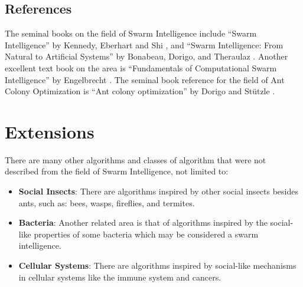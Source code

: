 \begin{bibunit}
\subsection{References}
The seminal books on the field of Swarm Intelligence include ``Swarm Intelligence'' by Kennedy, Eberhart and Shi \cite{Kennedy2001}, and ``Swarm Intelligence: From Natural to Artificial Systems'' by Bonabeau, Dorigo, and Theraulaz \cite{Bonabeau1999}. Another excellent text book on the area is ``Fundamentals of Computational Swarm Intelligence'' by Engelbrecht \cite{Engelbrecht2006}. The seminal book reference for the field of Ant Colony Optimization is ``Ant colony optimization'' by Dorigo and St\"utzle \cite{Dorigo2004}.

% 
% 
\section{Extensions}
There are many other algorithms and classes of algorithm that were not described from the field of Swarm Intelligence, not limited to:

\begin{itemize}
	\item \textbf{Social Insects}: There are algorithms inspired by other social insects besides ants, such as: bees, wasps, fireflies, and termites.
	\item \textbf{Bacteria}: Another related area is that of algorithms inspired by the social-like properties of some bacteria which may be considered a swarm intelligence.
	\item \textbf{Cellular Systems}: There are algorithms inspired by social-like mechanisms in cellular systems like the immune system and cancers.
\end{itemize}

\putbib
\end{bibunit}


\newpage\begin{bibunit}\putbib\end{bibunit}
\newpage\begin{bibunit}\putbib\end{bibunit}
\newpage\begin{bibunit}\putbib\end{bibunit}
\newpage\begin{bibunit}\putbib\end{bibunit}
\newpage\begin{bibunit}\putbib\end{bibunit}
